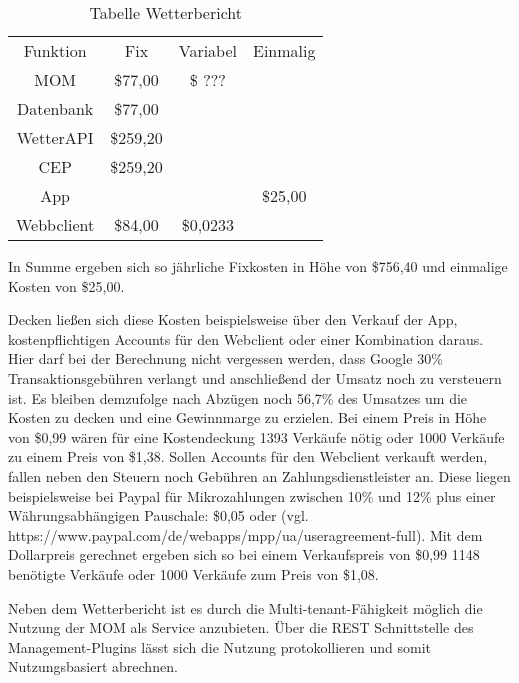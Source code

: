 \begin{table}
\caption{Tabelle Wetterbericht}
\centering
\begin{tabular}{cccc}
	Funktion 	& Fix		& Variabel	& Einmalig \\
	MOM 		& \$77,00	& \$ ??? 	& \\
	Datenbank	& \$77,00	&			& \\
	WetterAPI 	& \$259,20	&	 		& \\
	CEP 		& \$259,20	& 			& \\
	App			&			&			& \$25,00 \\
	Webbclient	& \$84,00	& \$0,0233	& \\
\end{tabular}
\end{table}

In Summe ergeben sich so jährliche Fixkosten in Höhe von \$756,40 und einmalige Kosten von \$25,00.

Decken ließen sich diese Kosten beispielsweise über den Verkauf der App, kostenpflichtigen Accounts für den Webclient oder einer Kombination daraus. Hier darf bei der Berechnung nicht vergessen werden, dass Google 30\% Transaktionsgebühren verlangt und anschließend der Umsatz noch zu versteuern ist. Es bleiben demzufolge nach Abzügen noch 56,7\% des Umsatzes um die Kosten zu decken und eine Gewinnmarge zu erzielen. Bei einem Preis in Höhe von \$0,99 wären für eine Kostendeckung 1393 Verkäufe nötig oder 1000 Verkäufe zu einem Preis von \$1,38. Sollen Accounts für den Webclient verkauft werden, fallen neben den Steuern noch Gebühren an Zahlungsdienstleister an. Diese liegen beispielsweise bei Paypal für Mikrozahlungen zwischen 10\% und 12\% plus einer Währungsabhängigen Pauschale: \$0,05 oder  (vgl. https://www.paypal.com/de/webapps/mpp/ua/useragreement-full). Mit dem Dollarpreis gerechnet ergeben sich so bei einem Verkaufspreis von \$0,99 1148 benötigte Verkäufe oder 1000 Verkäufe zum Preis von \$1,08.

Neben dem Wetterbericht ist es durch die Multi-tenant-Fähigkeit möglich die Nutzung der MOM als Service anzubieten. Über die REST Schnittstelle des Management-Plugins lässt sich die Nutzung protokollieren und somit Nutzungsbasiert abrechnen.